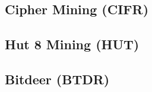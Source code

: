 \documentclass[]{article}
\begin{document}


\pagebreak

\subsection{Cipher Mining (CIFR)}



\pagebreak

\subsection{Hut 8 Mining (HUT)}



\pagebreak

\subsection{Bitdeer (BTDR)}


\end{document}
